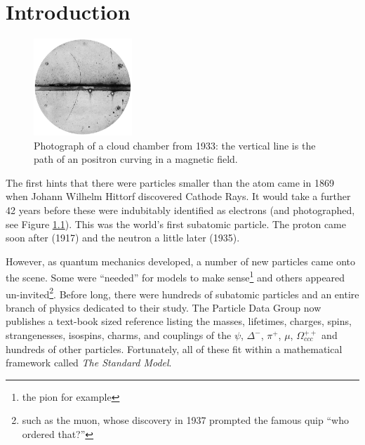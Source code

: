 \chapter{Introduction}\label{Sec:Intro}
\begin{figure}[h]
    \centering
        \includegraphics[width=0.33\textwidth]{F1/Cloud}
        \caption{Photograph of a cloud chamber from 1933: the vertical line is the path of an positron curving in a magnetic field.}
        \label{Fig:Intro:Elec}
\end{figure}

The first hints that there were particles smaller than the atom came in 1869 when Johann Wilhelm Hittorf discovered Cathode Rays\cite{cathode}. It would take a further 42 years before these were indubitably identified as electrons (and photographed, see Figure \ref{Fig:Intro:Elec}). This was the world's first subatomic particle. The proton came soon after (1917) and the neutron a little later (1935).

However, as quantum mechanics developed, a number of new particles came onto the scene. Some were ``needed'' for models to make sense\footnote{the pion for example} and others appeared un-invited\footnote{such as the muon, whose discovery in 1937 prompted the famous quip ``who ordered that?''}.  Before long, there were hundreds of subatomic particles and an entire branch of physics dedicated to their study. The Particle Data Group now publishes a text-book sized reference\cite{PDG-2014} listing the masses, lifetimes, charges, spins, strangenesses, isospins, charms, and couplings of the $\psi$, $\Delta^-$, $\pi^+$, $\mu$, $\Omega_{ccc}^{++}$ and hundreds of other particles. Fortunately, all of these fit within a mathematical framework called \textit{The Standard Model}.

